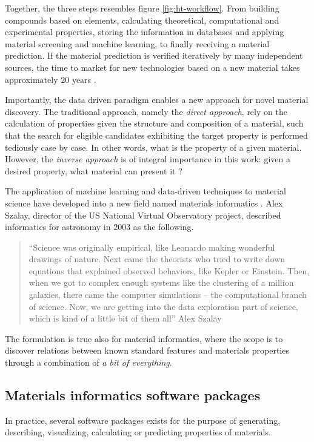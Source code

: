\noindent Together, the three steps resembles figure \autoref{fig:ht-workflow}. From building compounds based on elements, calculating theoretical, computational and experimental properties, storing the information in databases and applying material screening and machine learning, to finally receiving a material prediction. If the material prediction is verified iteratively by many independent sources, the time to market for new technologies based on a new material takes approximately $20$ years \cite{Eagar1995}.

Importantly, the data driven paradigm enables a new approach for novel material discovery. The traditional approach, namely the \textit{direct approach}, rely on the calculation of properties given the structure and composition of a material, such that the search for eligible candidates exhibiting the target property is performed tediously case by case. In other words, what is the property of a given material. However, the \textit{inverse approach} is of integral importance in this work: given a desired property, what material can present it \cite{Schleder2019}?

The application of machine learning and data-driven techniques to material science have developed into a new field named materials informatics \cite{Rajan2005}. Alex Szalay, director of the US National Virtual Observatory project, described informatics for astronomy in $2003$ as the following.
\begin{quote}
   ``Science was originally empirical, like Leonardo making wonderful drawings of nature. Next came the theorists who tried to write down equations that explained observed behaviors, like Kepler or Einstein. Then, when we got to complex enough systems like the clustering of a million galaxies, there came the computer simulations – the computational branch of science. Now, we are getting into the data exploration part of science, which is kind of a little bit of them all'' Alex Szalay \cite{Szalay2003}
\end{quote}
\noindent The formulation is true also for material informatics, where the scope is to discover relations between known standard features and materials properties through a combination of \emph{a bit of everything}.

\subsection{Materials informatics software packages}

In practice, several software packages exists for the purpose of generating, describing, visualizing, calculating or predicting properties of materials.

